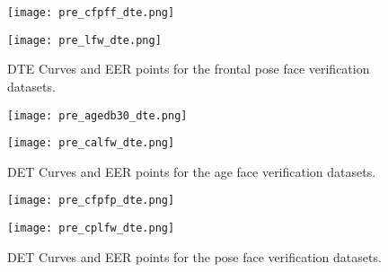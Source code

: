 \documentclass[class=report, crop=false, a4paper, 12pt]{standalone}
\begin{document}
\begin{figure}[H]
    \centering
    \begin{adjustbox}{center, minipage=1.2\textwidth, margin=0cm -0.1cm 0cm -0.1cm}  %
        \begin{minipage}[c]{0.49\textwidth}
            \centering
            \texttt{[image: pre\_cfpff\_dte.png]}
            \label{fig:dte_cfpff}
        \end{minipage}
        \hfill
        \begin{minipage}[c]{0.49\textwidth}
            \centering
            \texttt{[image: pre\_lfw\_dte.png]}
            \label{fig:dte_lfw}
        \end{minipage}
    \end{adjustbox}
    \vspace{-0.4cm}
    \caption{DTE Curves and EER points for the frontal pose face verification datasets.}
    \label{fig:dte_frontal}
  \end{figure}
  
  \begin{figure}[H]
    \begin{adjustbox}{center, minipage=1.2\textwidth, margin=0cm -0.1cm 0cm -0.1cm}  %
        \begin{minipage}[c]{0.49\textwidth}
            \centering
            \texttt{[image: pre\_agedb30\_dte.png]}
            \label{fig:dte_agedb30_a}
        \end{minipage}
        \hfill
        \begin{minipage}[c]{0.49\textwidth}
            \centering
            \texttt{[image: pre\_calfw\_dte.png]}
            \label{fig:dte_calfw_b}
        \end{minipage}
    \end{adjustbox}
    \vspace{-0.4cm}
    \caption{DET Curves and EER points for the age face verification datasets.}
    \label{fig:dte_age}
  \end{figure}
  
  \begin{figure}[H]
    \begin{adjustbox}{center, minipage=1.2\textwidth, margin=0cm -0.1cm 0cm -0.1cm}  %
        \begin{minipage}[c]{0.49\textwidth}
            \centering
            \texttt{[image: pre\_cfpfp\_dte.png]}
            \label{fig:dte_cfpfp_a}
        \end{minipage}
        \hfill
        \begin{minipage}[c]{0.49\textwidth}
            \centering
            \texttt{[image: pre\_cplfw\_dte.png]}
            \label{fig:dte_cplfw_b}
        \end{minipage}
    \end{adjustbox}
    \vspace{-0.4cm}
    \caption{DET Curves and EER points for the pose face verification datasets.}
    \label{fig:dte_pose}
  \end{figure}
  
\end{document}
